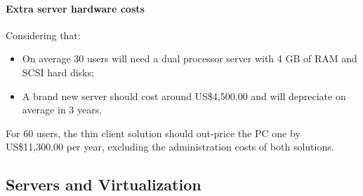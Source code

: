             \paragraph*{Extra server hardware costs}
                Considering that:
                \begin{itemize}
                    \item On average 30 users will need a dual processor server with 4 GB of RAM and SCSI hard disks;
                    \item A brand new server should cost around US\$4,500.00 and will depreciate on average in 3 years.
                \end{itemize}
                For 60 users, the thin client solution should out-price the PC one by US\$11,300.00 per year, excluding the administration costs of both solutions.

        \subsection{Servers and Virtualization} \label{sec2:servers_virtualization}
                        

